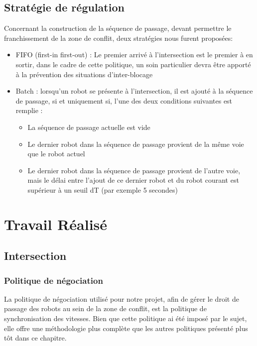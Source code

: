 \documentclass[french,a4paper,12pt]{report}
\begin{document}
\chapter{Stratégie de régulation}
Concernant la construction de la séquence de passage, devant permettre le franchissement de la zone de conflit, deux stratégies nous furent proposées:

\begin{itemize}
\item FIFO (first-in first-out) : 
	Le premier arrivé à l’intersection est le premier à en sortir, dans le cadre de cette
	politique, un soin particulier devra être apporté à la prévention des situations d’inter-blocage
	
\item Batch : lorsqu’un robot se présente à l’intersection, il est ajouté à la séquence de passage, si et
	uniquement si, l’une des deux conditions suivantes est remplie :
	\begin{itemize}
	\item La séquence de passage actuelle est vide
	\item Le dernier robot dans la séquence de passage provient de la même voie que le robot actuel
	\item Le dernier robot dans la séquence de passage provient de l’autre voie, mais le délai entre l’ajout
		de ce dernier robot et du robot courant est supérieur à un seuil dT (par exemple 5 secondes)
	\end{itemize}
\end{itemize}

\part{Travail Réalisé}


\chapter{Intersection}

\section{Politique de négociation}
La politique de négociation utilisé pour notre projet, afin de gérer le droit de passage des robots au sein de la zone de conflit, est la politique de synchronisation des vitesses. Bien que cette politique ai été imposé par le sujet, elle offre une méthodologie plus complète que les autres politiques présenté plus tôt dans ce chapitre.
\end{document}
